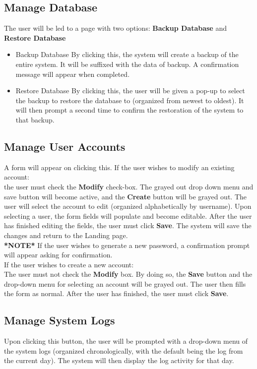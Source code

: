 \documentclass{article}
\begin{document}
\subsection{Manage Database}
\label{manageDB}
The user will be led to a page with two options: \textbf{Backup Database} and
\textbf{Restore Database}
\begin{itemize}
  \item Backup Database
    By clicking this, the system will create a backup of the entire system.
    It will be suffixed with the data of backup. A confirmation message will
    appear when completed.
  \item Restore Database
    By clicking this, the user will be given a pop-up to select the backup to
    restore the database to (organized from newest to oldest). It will then
    prompt a second time to confirm the restoration of the system to that backup.

\end{itemize}
\subsection{Manage User Accounts}
\label{manageAccts}
A form will appear on clicking this. 
If the user wishes to modify an existing account: \\
the user must check the \textbf{Modify} check-box. The grayed out drop down menu and
save button will become active, and the \textbf{Create} button will be grayed out.
The user will select the account to edit (organized alphabetically by username).
Upon selecting a user, the form fields will populate and become editable. After
the user has finished editing the fields, the user must click \textbf{Save}. The system
will save the changes and return to the Landing page. \\
\textbf{*NOTE*} If the user wishes to generate a new password, a confirmation
prompt will appear asking for confirmation.\\
If the user wishes to create a new account: \\
The user must not check the \textbf{Modify} box. By doing so, the \textbf{Save}
button and the drop-down menu for selecting an account will be grayed out.
The user then fills the form as normal. After the user has finished, the user
must click \textbf{Save}.
\subsection{Manage System Logs}
\label{manageLogs}
Upon clicking this button, the user will be prompted with a drop-down menu of
the system logs (organized chronologically, with the default being the log
from the current day). The system will then display the log activity for
that day.
\end{document}
